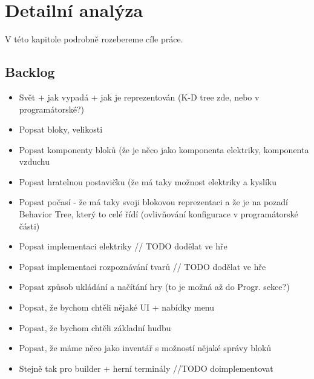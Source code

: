 
\chapter{Detailní analýza}

V této kapitole podrobně rozebereme cíle práce. 





















\section{Backlog}

\begin{itemize}
	\item Svět + jak vypadá + jak je reprezentován (K-D tree zde, nebo v programátorské?)
	\item Popsat bloky, velikosti
	\item Popsat komponenty bloků (že je něco jako komponenta elektriky, komponenta vzduchu
	\item Popsat hratelnou postavičku (že má taky možnost elektriky a kyslíku
	\item Popsat počasí - že má taky svoji blokovou reprezentaci a že je na pozadí Behavior Tree, který to celé řídí (ovlivňování konfigurace v programátorské části)
	\item Popsat implementaci elektriky // TODO dodělat ve hře
	\item Popsat implementaci rozpoznávání tvarů // TODO dodělat ve hře
	\item Popsat způsob ukládání a načítání hry (to je možná až do Progr. sekce?)
	\item Popsat, že bychom chtěli nějaké UI + nabídky menu
	\item Popsat, že bychom chtěli základní hudbu
	\item Popsat, že máme něco jako inventář s možností nějaké správy bloků
	\item Stejně tak pro builder + herní terminály  //TODO doimplementovat
\end{itemize}
